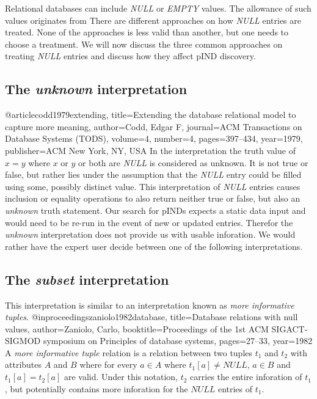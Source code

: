 
Relational databases can include \textit{NULL} or \textit{EMPTY} values.
The allowance of such values originates from %
There are different approaches on how \textit{NULL} entries are treated. None of the approaches
is less valid than another, but one needs to choose a treatment. We will now discuss the
three common approaches on treating \textit{NULL} entries and discuss how they affect pIND discovery.

\subsection{The \textit{unknown} interpretation}
@article{codd1979extending,
  title={Extending the database relational model to capture more meaning},
  author={Codd, Edgar F},
  journal={ACM Transactions on Database Systems (TODS)},
  volume={4},
  number={4},
  pages={397--434},
  year={1979},
  publisher={ACM New York, NY, USA}
}
In the interpretation the truth value of $x = y$ where $x$ or $y$ or both are \textit{NULL} is considered as unknown.
It is not true or false, but rather lies under the assumption that the \textit{NULL} entry could be filled using some,
possibly distinct value. This interpretation of \textit{NULL} entries causes inclusion or equality operations to also
return neither true or false, but also an \textit{unknown} truth statement.
Our search for pINDs expects a static data input and would need to be re-run in the event of new or updated entries.
Therefor the \textit{unknown} interpretation does not provide us with usable inforation. We would rather have the
expert user decide between one of the following interpretations.

\subsection{The \textit{subset} interpretation}
This interpretation is similar to an interpretation known as \textit{more informative tuples}.
@inproceedings{zaniolo1982database,
  title={Database relations with null values},
  author={Zaniolo, Carlo},
  booktitle={Proceedings of the 1st ACM SIGACT-SIGMOD symposium on Principles of database systems},
  pages={27--33},
  year={1982}
}
A \textit{more informative tuple} relation is a relation between two tuples $t_1$ and $t_2$ with attributes $A$ and $B$
where for every $a \in A$ where $t_1[a] \not = NULL$, $a \in B$ and $t_1[a] = t_2[a]$ are valid. Under this notation,
$t_2$ carries the entire inforation of $t_1$, but potentially contains more inforation for the $NULL$ entries of $t_1$.

